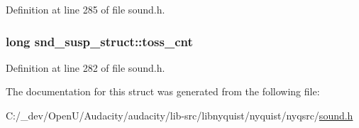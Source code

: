 Definition at line 285 of file sound.\+h.

\subsubsection[{\texorpdfstring{toss\+\_\+cnt}{toss_cnt}}]{\setlength{\rightskip}{0pt plus 5cm}long snd\+\_\+susp\+\_\+struct\+::toss\+\_\+cnt}\hypertarget{structsnd__susp__struct_afc2b723720dc47ea6889620660684494}{}\label{structsnd__susp__struct_afc2b723720dc47ea6889620660684494}


Definition at line 282 of file sound.\+h.



The documentation for this struct was generated from the following file\+:\begin{DoxyCompactItemize}
\item 
C\+:/\+\_\+dev/\+Open\+U/\+Audacity/audacity/lib-\/src/libnyquist/nyquist/nyqsrc/\hyperlink{sound_8h}{sound.\+h}\end{DoxyCompactItemize}

